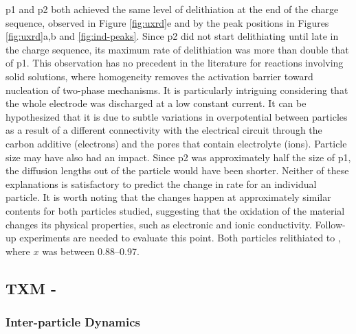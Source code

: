 \documentclass{article}
\begin{document}
\gls{p1} and \gls{p2} both achieved the same level of delithiation at
the end of the charge sequence, observed in Figure \ref{fig:uxrd}e and
by the peak positions in Figures \ref{fig:uxrd}a,b and
\ref{fig:ind-peaks}. Since \gls{p2} did not start delithiating until
late in the charge sequence, its maximum rate of delithiation was more
than double that of \gls{p1}. This observation has no precedent in the
literature for reactions involving solid solutions, where homogeneity
removes the activation barrier toward nucleation of two-phase
mechanisms. It is particularly intriguing considering that the whole
electrode was discharged at a low constant current. It can be
hypothesized that it is due to subtle variations in overpotential
between particles as a result of a different connectivity with the
electrical circuit through the carbon additive (electrons) and the
pores that contain electrolyte (ions). Particle size may have also had
an impact. Since \gls{p2} was approximately half the size of \gls{p1},
the  diffusion lengths out of the particle would have been
shorter. Neither of these explanations is satisfactory to predict the
change in rate for an individual particle. It is worth noting that the
changes happen at approximately similar  contents for both
particles studied, suggesting that the oxidation of the material
changes its physical properties, such as electronic and ionic
conductivity. Follow-up experiments are needed to evaluate this
point. Both particles relithiated to , where $x$ was between
\numrange{0.88}{0.97}.

\subsection{TXM - \nmc{}}

\subsubsection{\nmc[333]{} Inter-particle Dynamics}
\end{document}
